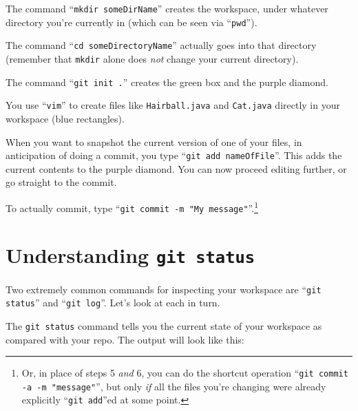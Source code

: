 \begin{compactenum}

\item The command ``{\small \texttt{mkdir someDirName}}'' creates the
workspace, under whatever directory you're currently in (which can be seen via
``{\small \texttt{pwd}}'').

\item The command ``{\small \texttt{cd someDirectoryName}}'' actually goes into
that directory (remember that \texttt{mkdir} alone does \textit{not} change
your current directory).

\item The command ``{\small \texttt{git init .}}'' creates the green box and
the purple diamond.

\item You use ``{\small \texttt{vim}}'' to create files like {\small
\texttt{Hairball.java}} and {\small \texttt{Cat.java}} directly in your
workspace (blue rectangles). \item When you want to snapshot the current
version of one of your files, in anticipation of doing a commit, you type
``{\small \texttt{git add nameOfFile}}''. This adds the current contents to the
purple diamond. You can now proceed editing further, or go straight to the
commit.

\item To actually commit, type ``{\small \texttt{git commit -m "My
message"}}''.\footnote{Or, in place of steps 5 \textit{and} 6, you can do the
shortcut operation ``\texttt{git commit -a -m "message"}'', but only
\textit{if} all the files you're changing were already explicitly ``\texttt{git
add}''ed at some point.}

\end{compactenum}

\section{Understanding \texttt{git status}}

Two extremely common commands for inspecting your workspace are ``\texttt{git
status}'' and ``\texttt{git log}''. Let's look at each in turn.


The {\small \texttt{git status}} command tells you the current state of your
workspace as compared with your repo. The output will look like this:

